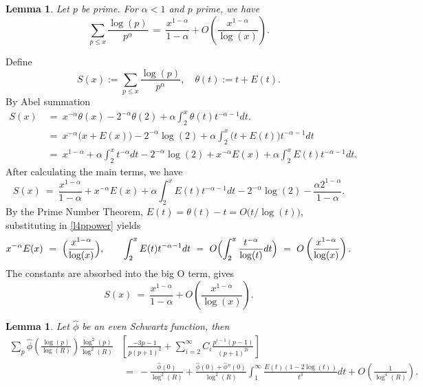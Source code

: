 \documentclass[11pt, reqno]{amsart}
\makeatletter
\renewenvironment{proof}[1][\proofname]{\par
  \vspace{-.7\topsep}%
  \pushQED{\qed}%
  \normalfont
  \topsep0pt \partopsep0pt %
  \trivlist
  \item[\hskip\labelsep
        \itshape
    #1\@addpunct{.}]\ignorespaces
}{%
  \popQED\endtrivlist\@endpefalse
  \addvspace{6pt plus 6pt} %
}
\newtheorem{lemma}[theorem]{Lemma}
\theoremstyle{definition}
\theoremstyle{remark}
\numberwithin{equation}{section}
\renewcommand{\hat}{\widehat}
\makeatother
\begin{document}
\begin{lemma}
      Let $p$ be prime. For $\alpha < 1$ and $p$ prime, we have
      \[
      \sum_{p\le x}\frac{\log(p)}{p^\alpha} 
      \ = \ \frac{x^{1-\alpha}}{1-\alpha} + O\left(\frac{x^{1-\alpha}}{\log(x)}\right).
      \]
\end{lemma}
\noindent
\begin{proof}
Define
\[
S(x):=\sum_{p\leq x}\frac{\log(p)}{p^\alpha}, \quad \theta(t) := t + E(t).
\]
By Abel summation
\begin{equation}
\begin{aligned}
S(x) 
&\ = \  x^{-\alpha}\theta(x)-2^{-\alpha}\theta(2)+\alpha\int_{2}^{x}\theta(t) t^{-\alpha-1} dt.\\
&\ = \  x^{-\alpha}\bigl(x+E(x)\bigr)-2^{-\alpha}\log (2)
+\alpha\int_{2}^{x} \bigl(t+E(t)\bigr) t^{-\alpha-1} dt\\
&\ = \  x^{1-\alpha} + \alpha\int_{2}^{x} t^{-\alpha} dt
-2 ^{-\alpha}\log (2)
+ x^{-\alpha}E(x) + \alpha\int_{2}^{x} E(t) t^{-\alpha-1} dt.
\end{aligned}
\end{equation}
After calculating the main terms, we have
\begin{equation}
S(x)\ = \ \frac{x^{1-\alpha}}{1-\alpha}
+x^{-\alpha}E(x)
+\alpha\int_{2}^{x} E(t) t^{-\alpha-1} dt
-2^{-\alpha}\log (2)-\frac{\alpha 2^{1-\alpha}}{1-\alpha}. \label{l4ppower}
\end{equation}
By the Prime Number Theorem, $E(t)=\theta(t)-t=O\bigl(t/ \log(t)\bigr)$, substituting in \eqref{l4ppower} yields
\begin{equation}
x^{-\alpha}E(x)\ = \ \Bigl(\frac{x^{1-\alpha}}{\log(x)}\Bigr),\qquad
\int_{2}^{x} E(t) t^{-\alpha-1}dt\ = \ O\Bigl(\int_{2}^{x}\frac{t^{-\alpha}}{\log(t)}dt\Bigr)
\ = \ O\left(\frac{x^{1-\alpha}}{\log(x)}\right).
\end{equation}
The constants are absorbed into the big O term, gives
\begin{equation}
S(x) \ = \  \frac{x^{1-\alpha}}{1-\alpha}+O\left(\frac{x^{1-\alpha}}{\log(x)}\right).
\end{equation}
\end{proof}
\begin{lemma}
    Let $\widehat\phi$ be an even Schwartz function, then
    \begin{equation}
    \begin{aligned}
    \sum_p\hat\phi\left(\frac{\log(p)}{\log(R)}\right)\frac{\log^2(p)}{\log^2(R)}&\left[\frac{-3p-1}{p(p+1)^2}+\sum_{i=2}^\infty C_i \frac{p^{i-1}(p-1)}{(p+1)^{2i}}\right]\\
    &\ = \ -\frac{\hat\phi(0)}{\log^2(R)}+\frac{\hat \phi(0)+\hat\phi''(0)}{\log^2(R)}\int_1^\infty \frac{E(t)(1-2\log(t))}{t^3}dt+O\left(\frac{1}{\log^4(R)}\right).
    \end{aligned} \label{l4sum}
    \end{equation}
\end{lemma}
\end{document}
